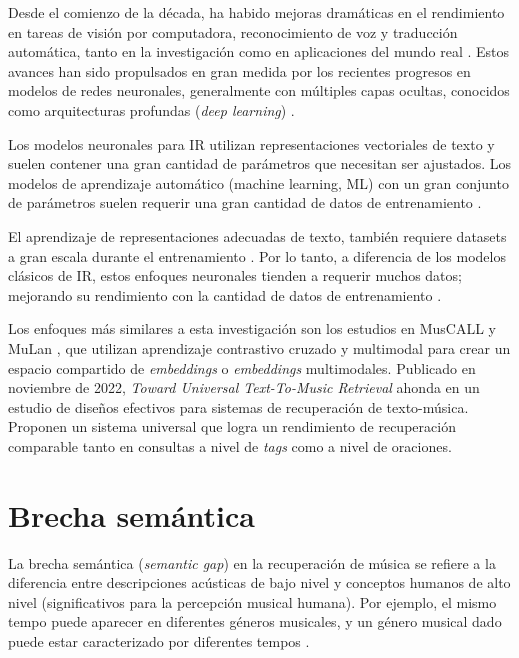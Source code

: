 Desde el comienzo de la década, ha habido mejoras dramáticas en el rendimiento en tareas de visión por computadora, reconocimiento de voz y traducción automática, tanto en la investigación como en aplicaciones del mundo real \cite{LeCun2015DeepL}. Estos avances han sido propulsados en gran medida por los recientes progresos en modelos de redes neuronales, generalmente con múltiples capas ocultas, conocidos como arquitecturas profundas (\textit{deep learning}) \cite{LeCun2015DeepL, Bahdanau2014NeuralMT, Deng2014DeepLM, Hinton2012DeepNN}. 

Los modelos neuronales para IR utilizan representaciones vectoriales de texto y suelen contener una gran cantidad de parámetros que necesitan ser ajustados. Los modelos de aprendizaje automático (machine learning, ML) con un gran conjunto de parámetros suelen requerir una gran cantidad de datos de entrenamiento \cite{Taylor2006OptimisationMF}.

El aprendizaje de representaciones adecuadas de texto, también requiere datasets a gran escala durante el entrenamiento \cite{Mitra2016LearningTM}. Por lo tanto, a diferencia de los modelos clásicos de IR, estos enfoques neuronales tienden a requerir muchos datos; mejorando su rendimiento con la cantidad de datos de entrenamiento \cite{Mitra2017NeuralMF}.

Los enfoques más similares a esta investigación son los estudios en MusCALL \cite{Manco2022ContrastiveAL} y MuLan \cite{Huang2022MuLanAJ}, que utilizan aprendizaje contrastivo cruzado y multimodal para crear un espacio compartido de \textit{embeddings} o \textit{embeddings} multimodales. Publicado en noviembre de 2022, \textit{Toward Universal Text-To-Music Retrieval} \cite{Doh2022TowardUT} ahonda en un estudio de diseños efectivos para sistemas de recuperación de texto-música. Proponen un sistema universal que logra un rendimiento de recuperación comparable tanto en consultas a nivel de \textit{tags} como a nivel de oraciones.

\section{Brecha semántica}
\label{sec:semantic-gap}

La brecha semántica (\textit{semantic gap}) en la recuperación de música se refiere a la diferencia entre descripciones acústicas de bajo nivel y conceptos humanos de alto nivel (significativos para la percepción musical humana). Por ejemplo, el mismo tempo puede aparecer en diferentes géneros musicales, y un género musical dado puede estar caracterizado por diferentes tempos \cite{Su2022HighperformanceCM}.


